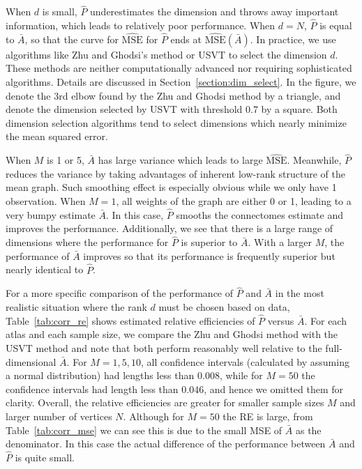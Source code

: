 \documentclass[10pt,letterpaper]{article}
\renewcommand{\hat}{\widehat}
\begin{document}
When $d$ is small, $\hat{P}$ underestimates the dimension and throws away important information, which leads to relatively poor performance. When $d=N$, $\hat{P}$ is equal to $\bar{A}$, so that the curve for $\hat{\mathrm{MSE}}$ for $\hat{P}$ ends at $\hat{\mathrm{MSE}}(\bar{A})$. 
In practice, we use algorithms like Zhu and Ghodsi's method or USVT to select the dimension $d$. These methods are neither computationally advanced nor requiring sophisticated algorithms. Details are discussed in Section~\ref{section:dim_select}. 
In the figure, we denote the 3rd elbow found by the Zhu and Ghodsi method by a triangle, and denote the dimension selected by USVT with threshold 0.7 by a square. 
Both dimension selection algorithms tend to select dimensions which nearly minimize the mean squared error.

When $M$ is 1 or 5, $\bar{A}$ has large variance which leads to large $\hat{\mathrm{MSE}}$. Meanwhile, $\hat{P}$ reduces the variance by taking advantages of inherent low-rank structure of the mean graph. Such smoothing effect is especially obvious while we only have 1 observation. When $M = 1$, all weights of the graph are either 0 or 1, leading to a very bumpy estimate $\bar{A}$. In this case, $\hat{P}$ smooths the connectomes estimate and improves the performance.
Additionally, we see that there is a large range of dimensions where the performance for $\hat{P}$ is superior to $\bar{A}$. 
With a larger $M$, the performance of $\bar{A}$ improves so that its performance is frequently superior but nearly identical to $\hat{P}$.

For a more specific comparison of the performance of $\hat{P}$ and $\bar{A}$ in the most realistic situation where the rank $d$ must be chosen based on data, Table~\ref{tab:corr_re} shows estimated relative efficiencies of $\hat{P}$ versus $\bar{A}$.
For each atlas and each sample size, we compare the Zhu and Ghodsi method \citep{zhu2006automatic} with the USVT method \citep{chatterjee2015matrix} and note that both perform reasonably well relative to the full-dimensional $\bar{A}$.
For $M = 1, 5, 10$, all confidence intervals (calculated by assuming a normal distribution) had lengths less than $0.008$, while for $M=50$ the confidence intervals had length less than $0.046$, and hence we omitted them for clarity. Overall, the relative efficiencies are greater for smaller sample sizes $M$ and larger number of vertices $N$. Although for $M=50$ the RE is large, from Table~\ref{tab:corr_mse} we can see this is due to the small MSE of $\bar{A}$ as the denominator. In this case the actual difference of the performance between $\bar{A}$ and $\hat{P}$ is quite small.
\end{document}
